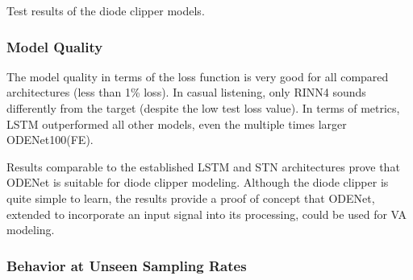 \begin{table}[]
    
    \caption{Test results of the diode clipper models.}
    \label{tab:diode_clipper_results}
\end{table}

\subsubsection{Model Quality}

The model quality in terms of the loss function is very good for all compared architectures (less than 1\% loss). In casual listening, only \ac{RINN}4 sounds differently from the target (despite the low test loss value). In terms of metrics, \ac{LSTM} outperformed all other models, even the multiple times larger ODENet100(FE).

Results comparable to the established \ac{LSTM} and \ac{STN} architectures prove that ODENet is suitable for diode clipper modeling. Although the diode clipper is quite simple to learn, the results provide a proof of concept that ODENet, extended to incorporate an input signal into its processing, could be used for \ac{VA} modeling.

\subsubsection{Behavior at Unseen Sampling Rates}

